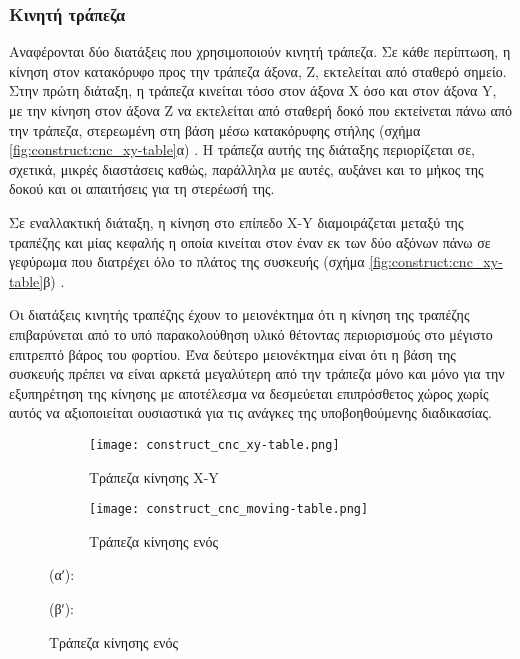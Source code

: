 \subsubsection{Κινητή τράπεζα}

Αναφέρονται δύο διατάξεις που χρησιμοποιούν κινητή τράπεζα. Σε κάθε περίπτωση, η
κίνηση στον κατακόρυφο προς την τράπεζα άξονα, Z, εκτελείται από σταθερό σημείο.
Στην πρώτη διάταξη, η τράπεζα κινείται τόσο στον άξονα X όσο και στον άξονα Y,
με την κίνηση στον άξονα Z να εκτελείται από σταθερή δοκό που εκτείνεται πάνω
από την τράπεζα, στερεωμένη στη βάση μέσω κατακόρυφης στήλης (σχήμα
\ref{fig:construct:cnc_xy-table}α) \parencite[69]{albert11}.
Η τράπεζα αυτής της διάταξης περιορίζεται σε, σχετικά, μικρές διαστάσεις καθώς,
παράλληλα με αυτές, αυξάνει και το μήκος της δοκού και οι απαιτήσεις για τη
στερέωσή της.

Σε εναλλακτική διάταξη, η κίνηση στο επίπεδο X-Y διαμοιράζεται μεταξύ της
τραπέζης και μίας κεφαλής η οποία κινείται στον έναν εκ των δύο αξόνων πάνω σε
γεφύρωμα που διατρέχει όλο το πλάτος της συσκευής (σχήμα
\ref{fig:construct:cnc_xy-table}β) \parencite[70]{albert11}.

Οι διατάξεις κινητής τραπέζης έχουν το μειονέκτημα ότι η κίνηση της τραπέζης
επιβαρύνεται από το υπό παρακολούθηση υλικό θέτοντας περιορισμούς στο μέγιστο
επιτρεπτό βάρος του φορτίου.
Ένα δεύτερο μειονέκτημα είναι ότι η βάση της συσκευής πρέπει να είναι αρκετά
μεγαλύτερη από την τράπεζα μόνο και μόνο για την εξυπηρέτηση της κίνησης με
αποτέλεσμα να δεσμεύεται επιπρόσθετος χώρος χωρίς αυτός να αξιοποιείται
ουσιαστικά για τις ανάγκες της υποβοηθούμενης διαδικασίας.

\begin{figure}
    \caption{Διατάξεις κινούμενης τραπέζης.
        \label{fig:construct:cnc_moving-table}}
    \begin{center}
        \begin{subfigure}[b]{0.30\textwidth}
            \texttt{[image: construct\_cnc\_xy-table.png]}
            \caption{Τράπεζα κίνησης X-Y}
        \end{subfigure}
        \begin{subfigure}[b]{0.45\textwidth}
            \texttt{[image: construct\_cnc\_moving-table.png]}
            \caption{Τράπεζα κίνησης ενός }
        \end{subfigure}
    \end{center}

    (αʹ): 

    (βʹ): 
\end{figure}

